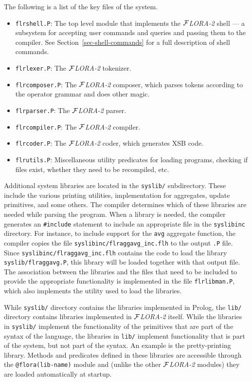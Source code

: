 \documentclass[11pt]{article}
\newcommand{\FLORA}{{\mbox{${\cal F}${\small\it LORA}\rm\emph{-2}}}\xspace}
\begin{document}
The following is a list of the key files of the system.
\begin{itemize}
\item \texttt{flrshell.P}: The top level module that implements the \FLORA
  shell --- a subsystem for accepting user commands and queries and passing
  them to the compiler.  See Section~\ref{sec-shell-commands} for a full
  description of shell commands.
\item \texttt{flrlexer.P}: The \FLORA tokenizer.
\item \texttt{flrcomposer.P}: The \FLORA composer, which parses tokens
  according to the operator grammar and does other magic.
\item \texttt{flrparser.P}: The \FLORA parser.
\item \texttt{flrcompiler.P}: The \FLORA compiler.
\item \texttt{flrcoder.P}: The \FLORA coder, which generates XSB code.
\item \texttt{flrutils.P}: Miscellaneous utility predicates for loading
  programs, checking if files exist, whether they need to be recompiled,
  etc.
\end{itemize}
Additional system libraries are located in the {\tt syslib/} subdirectory.
These include the various printing utilities, implementation for
aggregates, update primitives, and some others. The compiler determines
which of these libraries are needed while parsing the program. When a
library is needed, the compiler generates an {\tt \#include} statement to
include an appropriate file in the {\tt syslibinc} directory. For instance,
to include support for the {\tt avg} aggregate function, the compiler
copies the file {\tt syslibinc/flraggavg\_inc.flh} to the output {\tt .P}
file.  Since {\tt syslibinc/flraggavg\_inc.flh} contains the code to load
the library {\tt syslib/flraggavg.P}, this library will be loaded together
with that output file. The association between the libraries and the files
that need to be included to provide the appropriate functionality is
implemented in the file {\tt flrlibman.P}, which also implements the
utility used to load the libraries.

While {\tt syslib/} directory contains the libraries implemented in Prolog,
the {\tt lib/} directory contains libraries implemented in \FLORA itself.
While the libraries in {\tt syslib/} implement the functionality of the
primitives that are part of the syntax of the language, the
libraries in {\tt lib/} implement functionality that is part of the system, but
not part of the syntax. An example is the pretty-printing library.
Methods and predicates defined in these libraries are accessible through
the {\tt @flora(lib-name)} module and (unlike the other \FLORA modules)
they are loaded automatically at startup.
\end{document}
